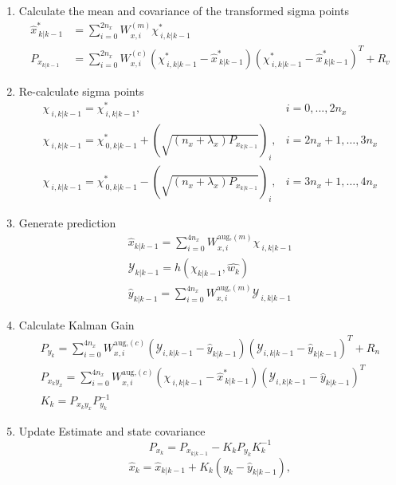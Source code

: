 \begin{enumerate}
    \item Calculate the mean and covariance of the transformed sigma points
    \begin{align}
        \hat{x}^{*}_{\ k|k-1} &= \sum_{i=0}^{2n_{x}} W^{(m)}_{x,i} \chi^{*}_{\ i, k|k-1} \\
        P_{x_{k|k-1}} &=  \sum_{i=0}^{2n_{x}} W^{(c)}_{x,i} (\chi^{*}_{\ i, k|k-1} - \hat{x}^{*}_{\ k|k-1})(\chi^{*}_{\ i, k|k-1} - \hat{x}^{*}_{\ k|k-1})^{T} + R_{v} %
    \end{align}
    \item Re-calculate sigma points
    \begin{align}
        \chi_{\ i, k|k-1} = \chi^{*}_{\ i,k|k-1}, & i=0,...,2n_{x} \\
        \chi_{\ i, k|k-1} = \chi^{*}_{\ 0,k|k-1} + (\sqrt{(n_{x}+\lambda_{x})P_{x_{k|k-1}}})_{i},  & i=2n_{x}+1,\dots,3n_{x} \\
        \chi_{\ i, k|k-1} = \chi^{*}_{\ 0,k|k-1} - (\sqrt{(n_{x}+\lambda_{x})P_{x_{k|k-1}}})_{i}, &  i=3n_{x}+1,\dots,4n_{x}
    \end{align}
    \item Generate prediction
    \begin{align}
        \hat{x}_{k|k-1} = \sum_{i=0}^{4n_{x}} W^{\text{aug,}(m)}_{x,i} \chi_{\ i, k|k-1} \\
        \mathcal{Y}_{k|k-1} = h(\chi_{k|k-1},\hat{w_{k}}) \\
        \hat{y}_{k|k-1} = \sum_{i=0}^{4n_{x}} W^{\text{aug,}(m)}_{x,i} \mathcal{Y}_{\ i, k|k-1}
    \end{align}
    \item Calculate Kalman Gain
    \begin{align}
        P_{y_{k}} = \sum_{i=0}^{4n_{x}} W^{\text{aug,}(c)}_{x,i} (\mathcal{Y}_{i, k|k-1} - \hat{y}_{k|k-1})(\mathcal{Y}_{i, k|k-1} - \hat{y}_{k|k-1})^{T} + R_{n}  \\ %
        P_{x_{k}y_{x}} = \sum_{i=0}^{4n_{x}} W^{\text{aug,}(c)}_{x,i} (\chi_{\ i, k|k-1} - \hat{x}^{*}_{\ k|k-1})(\mathcal{Y}_{i, k|k-1} - \hat{y}_{k|k-1})^{T} \\
        K_{k} = P_{x_{k}y_{x}}P^{-1}_{y_{k}}
    \end{align}
    \item Update Estimate and state covariance
    \begin{equation}
        P_{x_{k}} = P_{x_{k|k-1}} - K_{k}P_{y_{k}}K^{-1}_{k} 
    \end{equation}
    \begin{equation}
        \hat{x}_{k} = \hat{x}_{k|k-1} + K_{k}(y_{k}-\hat{y}_{k|k-1}),
    \end{equation}
    
\end{enumerate}